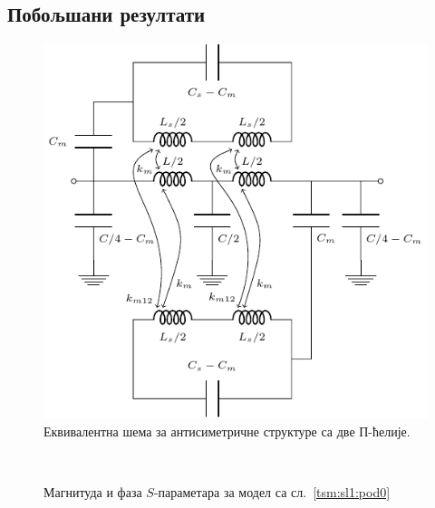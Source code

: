 \documentclass[main.tex]{subfiles}
\begin{document}
\subsection{Побољшани резултати}
\begin{figure}
    \begin{center}
        \includegraphics[scale=1]{sl_tsm/ekv2cel.pdf}
    \caption{Еквивалентна шема за антисиметричне структуре са две П-ћелије.}
    \label{tsm:sl:ekv2cel}
  \end{center}
\end{figure}
\begin{figure}[!t]
\centering
{}\\
\caption{Магнитуда и фаза $S$-параметара за модел са сл.~\ref{tsm:sl1:pod0}}
\label{tsm:rez:pod0}
\end{figure}
\end{document}
